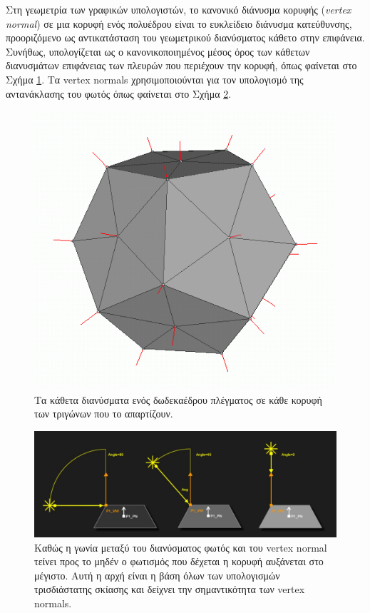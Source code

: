 Στη γεωμετρία των γραφικών υπολογιστών, το κανονικό διάνυσμα κορυφής (\textsl{vertex normal}) σε μια κορυφή ενός πολυέδρου είναι το ευκλείδειο διάνυσμα κατεύθυνσης, προοριζόμενο ως αντικατάσταση του γεωμετρικού διανύσματος κάθετο στην επιφάνεια. Συνήθως, υπολογίζεται ως ο κανονικοποιημένος μέσος όρος των κάθετων διανυσμάτων επιφάνειας των πλευρών που περιέχουν την κορυφή, όπως φαίνεται στο Σχήμα \ref{fig:vertex_normal}. Τα vertex normals χρησιμοποιούνται για τον υπολογισμό της αντανάκλασης του φωτός όπως φαίνεται στο Σχήμα \ref{fig:vertex_normal_reflection}.

\begin{figure}[h]
	\label{fig:vertex_normal}	
	\centering
	\includegraphics[scale=0.5]{images/appendix/vertex_normal.png}
	\caption[Κάθετα διανύσματα κορυφών πολύεδρου]{Τα κάθετα διανύσματα ενός δωδεκαέδρου πλέγματος σε κάθε κορυφή των τριγώνων που το απαρτίζουν.}
\end{figure}

\begin{figure}[h]
	\label{fig:vertex_normal_reflection}	
	\centering
	\includegraphics[scale=0.7]{images/appendix/vertex_normal_reflection.jpg}
	\caption[Αντανάκλαση του φωτός στο κάθετο διάνυσμα]{Καθώς η γωνία μεταξύ του διανύσματος φωτός και του vertex normal τείνει προς το μηδέν ο φωτισμός που δέχεται η κορυφή αυξάνεται στο μέγιστο. Αυτή η αρχή είναι η βάση όλων των υπολογισμών τρισδιάστατης σκίασης και δείχνει την σημαντικότητα των vertex normals.}
\end{figure}
